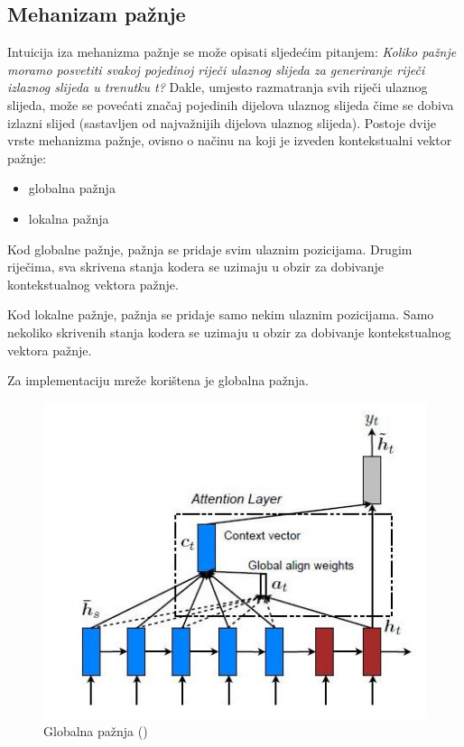 \documentclass[times, utf8, zavrsni, numeric]{fer}
\begin{document}
\subsection{Mehanizam pažnje}
Intuicija iza mehanizma pažnje se može opisati sljedećim pitanjem: \emph{Koliko pažnje moramo posvetiti svakoj pojedinoj riječi ulaznog slijeda za generiranje riječi izlaznog slijeda u trenutku t?}
Dakle, umjesto razmatranja svih riječi ulaznog slijeda, može se povećati značaj pojedinih dijelova ulaznog slijeda čime se dobiva izlazni slijed (sastavljen od najvažnijih dijelova ulaznog slijeda).
Postoje dvije vrste mehanizma pažnje, ovisno o načinu na koji je izveden kontekstualni vektor pažnje:
\begin{itemize}
    \item globalna pažnja
    \item lokalna pažnja
\end{itemize}
\par
Kod globalne pažnje, pažnja se pridaje svim ulaznim pozicijama. Drugim riječima, sva skrivena stanja kodera se uzimaju u obzir za dobivanje kontekstualnog vektora pažnje.
\par
Kod lokalne pažnje, pažnja se pridaje samo nekim ulaznim pozicijama. Samo nekoliko skrivenih stanja kodera se uzimaju u obzir za dobivanje kontekstualnog vektora pažnje.
\par
Za implementaciju mreže korištena je globalna pažnja.
\begin{figure}[htb]
\centering
\includegraphics[width=15cm]{img/global-attention.jpg}
\caption{Globalna pažnja (\citet{article3})}
\label{fig:global-attention}
\end{figure}
\end{document}

